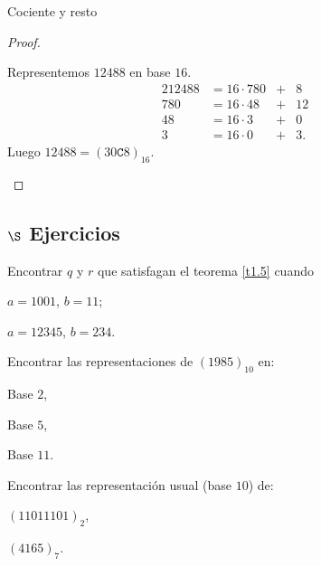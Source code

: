 \begin{section}{Cociente y resto}
\begin{proof}
\begin{ejemplo*} Representemos  $12488$ en  base $16$.
\begin{alignat*}2
12488 &= 16 \cdot 780 &+&  8\\
780 & = 16 \cdot 48 &+& 12\\
48 & = 16\cdot 3 &+& 0\\
3 & = 16 \cdot 0  &+& 3.
\end{alignat*}
Luego $12488 = (30\texttt{C}8)_{16}$.
\end{ejemplo*}


\end{proof}

\subsection*{$\S$ Ejercicios}

\begin{enumex}
    \item Encontrar $q$ y $r$ que satisfagan el teorema \ref{t1.5} cuando
    \begin{enumex}
        \item $a = 1001$, \qquad $b = 11$;
        
        \item $a = 12345$, \qquad $b = 234$.
    \end{enumex}


    \item Encontrar las representaciones de $(1985)_{10}$ en:
    \begin{enumex}
        \begin{minipage}{0.25\textwidth}
            \item Base $2$,
        \end{minipage}
        \begin{minipage}{0.25\textwidth}
            \item Base $5$,
        \end{minipage}
        \begin{minipage}{0.25\textwidth}
            \item Base $11$.
        \end{minipage}
    \end{enumex}

    \item  Encontrar las representación usual (base $10$) de:
    \begin{enumex}
        \begin{minipage}{0.25\textwidth}
            \item $(11011101)_2$,
        \end{minipage}
        \begin{minipage}{0.25\textwidth}
            \item $(4165)_7$.
        \end{minipage}
    \end{enumex} 
\end{enumex}

\end{section}


